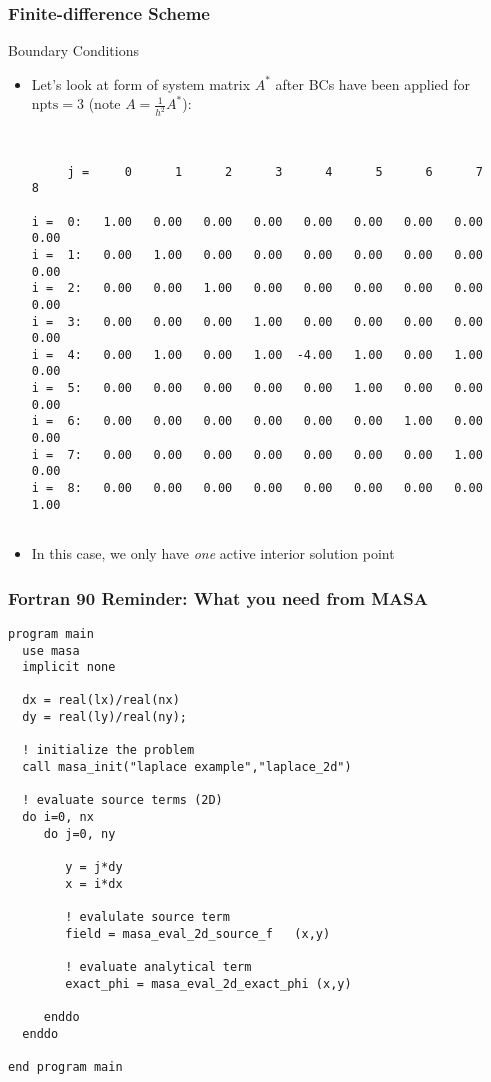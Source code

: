\documentclass[mathserif]{beamer}
\begin{document}
\begin{frame}[fragile]
  \frametitle{Finite-difference Scheme}
    \begin{block}{Boundary Conditions}
      \begin{itemize} 
          \item Let's look at form of system matrix $A^*$ after BCs have
	    been applied for $\text{npts}=3$ (note $A=\frac{1}{h^2}A^*$):
{\tiny
\begin{verbatim}


     j =     0      1      2      3      4      5      6      7      8 

i =  0:   1.00   0.00   0.00   0.00   0.00   0.00   0.00   0.00   0.00 
i =  1:   0.00   1.00   0.00   0.00   0.00   0.00   0.00   0.00   0.00 
i =  2:   0.00   0.00   1.00   0.00   0.00   0.00   0.00   0.00   0.00 
i =  3:   0.00   0.00   0.00   1.00   0.00   0.00   0.00   0.00   0.00 
i =  4:   0.00   1.00   0.00   1.00  -4.00   1.00   0.00   1.00   0.00 
i =  5:   0.00   0.00   0.00   0.00   0.00   1.00   0.00   0.00   0.00 
i =  6:   0.00   0.00   0.00   0.00   0.00   0.00   1.00   0.00   0.00 
i =  7:   0.00   0.00   0.00   0.00   0.00   0.00   0.00   1.00   0.00 
i =  8:   0.00   0.00   0.00   0.00   0.00   0.00   0.00   0.00   1.00 


\end{verbatim}
}
\item In this case, we only have {\em one} active interior solution point
      \end{itemize}
    \end{block}
\end{frame}

\begin{frame}[fragile]
\frametitle{Fortran 90 Reminder: What you need from MASA}
{\tiny
\begin{verbatim}
program main
  use masa
  implicit none

  dx = real(lx)/real(nx)
  dy = real(ly)/real(ny);

  ! initialize the problem
  call masa_init("laplace example","laplace_2d")

  ! evaluate source terms (2D)
  do i=0, nx
     do j=0, ny
         
        y = j*dy        
        x = i*dx
        
        ! evalulate source term
        field = masa_eval_2d_source_f   (x,y)

        ! evaluate analytical term
        exact_phi = masa_eval_2d_exact_phi (x,y)

     enddo
  enddo

end program main

\end{verbatim}
}
\end{frame}
\end{document}
